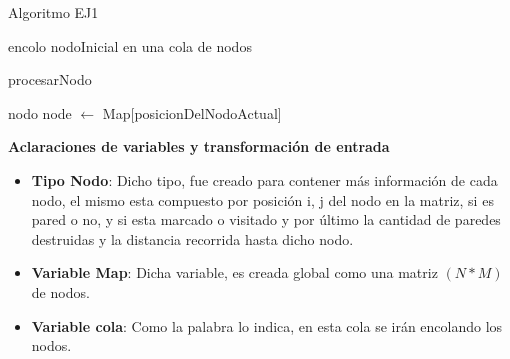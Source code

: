 \begin{algorithm}[H] %
 \caption{Algoritmo EJ1}
	encolo nodoInicial en una cola de nodos \\
	    
\end{algorithm}


\begin{algorithm}[H] %
 \caption{procesarNodo}
 	nodo node $\gets$ Map[posicionDelNodoActual]\\
	
             
			
			
\end{algorithm}


\textbf{Aclaraciones de variables y transformaci\'on de entrada}

\begin{itemize}
\item {\bf Tipo Nodo}: Dicho tipo, fue creado para contener m\'as informaci\'on de cada nodo, el mismo esta compuesto por posici\'on i, j del nodo en la matriz, si es pared o no, y si esta marcado o visitado y por \'ultimo la cantidad de paredes destruidas y la distancia recorrida hasta dicho nodo.
\item {\bf Variable Map}: Dicha variable, es creada global como una matriz $(N \ast M)$ de nodos.
\item {\bf Variable cola}: Como la palabra lo indica, en esta cola se ir\'an encolando los nodos.
\end{itemize}  


